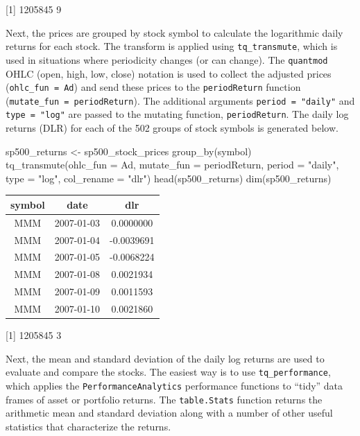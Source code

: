 {[}1{]} 1205845 9

\hspace{20 mm}

Next, the prices are grouped by stock symbol to calculate the
logarithmic daily returns for each stock. The transform is applied using
\texttt{tq\_transmute}, which is used in situations where periodicity
changes (or can change). The \texttt{quantmod} OHLC (open, high, low,
close) notation is used to collect the adjusted prices
(\texttt{ohlc\_fun\ =\ Ad}) and send these prices to the
\texttt{periodReturn} function (\texttt{mutate\_fun\ =\ periodReturn}).
The additional arguments \texttt{period\ =\ "daily"} and
\texttt{type\ =\ "log"} are passed to the mutating function,
\texttt{periodReturn}. The daily log returns (DLR) for each of the 502
groups of stock symbols is generated below.

\begin{Schunk}
\begin{Sinput}
sp500_returns <- sp500_stock_prices %
    group_by(symbol) %
    tq_transmute(ohlc_fun = Ad, mutate_fun = periodReturn, 
                 period = "daily", type = "log", col_rename = "dlr")
head(sp500_returns)
dim(sp500_returns)
\end{Sinput}
\end{Schunk}

\begin{tabular}{ccc}
\toprule
symbol & date & dlr\\
\midrule
MMM & 2007-01-03 & 0.0000000\\
MMM & 2007-01-04 & -0.0039691\\
MMM & 2007-01-05 & -0.0068224\\
MMM & 2007-01-08 & 0.0021934\\
MMM & 2007-01-09 & 0.0011593\\
MMM & 2007-01-10 & 0.0021860\\
\bottomrule
\end{tabular}

{[}1{]} 1205845 3

\hspace{20 mm}

Next, the mean and standard deviation of the daily log returns are used
to evaluate and compare the stocks. The easiest way is to use
\texttt{tq\_performance}, which applies the
\texttt{PerformanceAnalytics} performance functions to ``tidy'' data
frames of asset or portfolio returns. The \texttt{table.Stats} function
returns the arithmetic mean and standard deviation along with a number
of other useful statistics that characterize the returns.

